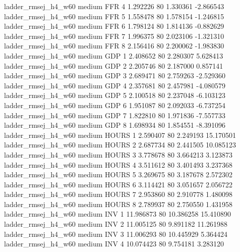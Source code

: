 ladder_rmsej_h4_w60     medium      FFR                 4  1.292226 80       1.330361          -2.866543
ladder_rmsej_h4_w60     medium      FFR                 5  1.558478 80       1.578154          -1.246815
ladder_rmsej_h4_w60     medium      FFR                 6  1.798124 80       1.814136          -0.882629
ladder_rmsej_h4_w60     medium      FFR                 7  1.996375 80       2.023106          -1.321310
ladder_rmsej_h4_w60     medium      FFR                 8  2.156416 80       2.200062          -1.983830
ladder_rmsej_h4_w60     medium      GDP                 1  2.408652 80       2.280307           5.628413
ladder_rmsej_h4_w60     medium      GDP                 2  2.205746 80       2.187000           0.857141
ladder_rmsej_h4_w60     medium      GDP                 3  2.689471 80       2.759263          -2.529360
ladder_rmsej_h4_w60     medium      GDP                 4  2.357681 80       2.457981          -4.080579
ladder_rmsej_h4_w60     medium      GDP                 5  2.100518 80       2.237048          -6.103123
ladder_rmsej_h4_w60     medium      GDP                 6  1.951087 80       2.092033          -6.737254
ladder_rmsej_h4_w60     medium      GDP                 7  1.822810 80       1.971836          -7.557733
ladder_rmsej_h4_w60     medium      GDP                 8  1.698934 80       1.854551          -8.391096
ladder_rmsej_h4_w60     medium    HOURS                 1  2.590407 80       2.249193          15.170501
ladder_rmsej_h4_w60     medium    HOURS                 2  2.687734 80       2.441505          10.085123
ladder_rmsej_h4_w60     medium    HOURS                 3  3.778678 80       3.664213           3.123873
ladder_rmsej_h4_w60     medium    HOURS                 4  3.511612 80       3.401493           3.237368
ladder_rmsej_h4_w60     medium    HOURS                 5  3.269675 80       3.187678           2.572302
ladder_rmsej_h4_w60     medium    HOURS                 6  3.114421 80       3.051657           2.056722
ladder_rmsej_h4_w60     medium    HOURS                 7  2.953860 80       2.910778           1.480098
ladder_rmsej_h4_w60     medium    HOURS                 8  2.789937 80       2.750550           1.431958
ladder_rmsej_h4_w60     medium      INV                 1 11.986873 80      10.386258          15.410890
ladder_rmsej_h4_w60     medium      INV                 2 11.005125 80       9.891182          11.261988
ladder_rmsej_h4_w60     medium      INV                 3 11.006293 80      10.445929           5.364424
ladder_rmsej_h4_w60     medium      INV                 4 10.074423 80       9.754181           3.283120
